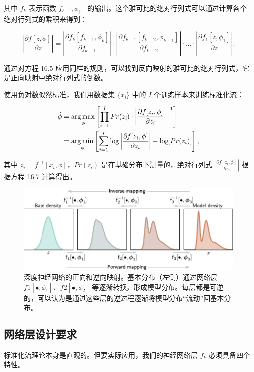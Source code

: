 \documentclass[lang=cn,newtx,10pt,scheme=chinese]{elegantbook}
\begin{document}
其中 \(f_k\) 表示函数 \(f_{\ell}[\cdot, \phi_{\ell}]\) 的输出。这个雅可比的绝对行列式可以通过计算各个绝对行列式的乘积来得到：

\begin{equation}
\left| \frac{\partial f[z, \phi]}{\partial z} \right| = \left| \frac{\partial f_k[f_{k-1}, \phi_k]}{\partial f_{k-1}} \right| \cdot \left| \frac{\partial f_{k-1}[f_{k-2}, \phi_{k-1}]}{\partial f_{k-2}} \right| \cdot ... \cdot \left| \frac{\partial f_1[z, \phi_1]}{\partial z} \right|. 
\end{equation}

通过对方程 16.5 应用同样的规则，可以找到反向映射的雅可比的绝对行列式，它是正向映射中绝对行列式的倒数。

使用负对数似然标准，我们用数据集 \(\{x_i\}\) 中的 \(I\) 个训练样本来训练标准化流：


\begin{align}
\hat{\phi} &= \underset{\phi}{\arg\max} \left[ \prod_{i=1}^I Pr(z_i) \cdot \left| \frac{\partial f[z_i, \phi]}{\partial z_i} \right|^{-1} \right] \notag \\
&= \underset{\phi}{\arg\min} \left[ \sum_{i=1}^I \log \left| \frac{\partial f[z_i, \phi]}{\partial z_i} \right| - \log[Pr(z_i)] \right], 
\end{align} 


其中 \(z_i = f^{-1}[x_i, \phi]\)，\(Pr(z_i)\) 是在基础分布下测量的，绝对行列式 \(\left| \frac{\partial f[z_i, \phi]}{\partial z_i} \right|\) 根据方程 16.7 计算得出。

\begin{figure}[ht!]
\centering
\includegraphics[width=0.7\linewidth]{PDFFigures/UDLChap16PDF/FlowTransformLayers.pdf}
\caption{深度神经网络的正向和逆向映射。基本分布（左侧）通过网络层 \(f1[•, \phi_1]\)、\(f2[•, \phi_2]\) 等逐渐转换，形成模型分布。每层都是可逆的，可以认为是通过这些层的逆过程逐渐将模型分布“流动”回基本分布。}
\end{figure}


\subsection{网络层设计要求}
标准化流理论本身是直观的。但要实际应用，我们的神经网络层 \(f_k\) 必须具备四个特性。
\end{document}
